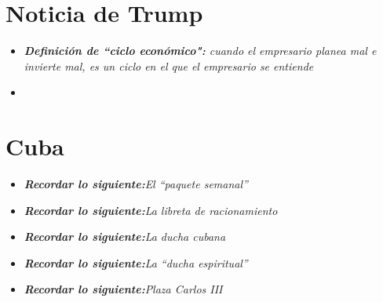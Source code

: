 \section{Noticia de Trump}
\begin{itemize}
    \item \emph{\textbf{Definición de ``ciclo económico":} cuando el empresario planea mal e invierte mal, es un ciclo en el que el empresario se entiende }
    \item  
\end{itemize}

\section{Cuba}
\begin{itemize}
    \item \emph{\textbf{Recordar lo siguiente:}El ``paquete semanal''}
    \item \emph{\textbf{Recordar lo siguiente:}La libreta de racionamiento}
    \item \emph{\textbf{Recordar lo siguiente:}La ducha cubana}
    \item \emph{\textbf{Recordar lo siguiente:}La ``ducha espiritual''}
    \item \emph{\textbf{Recordar lo siguiente:}Plaza Carlos III}
\end{itemize}
